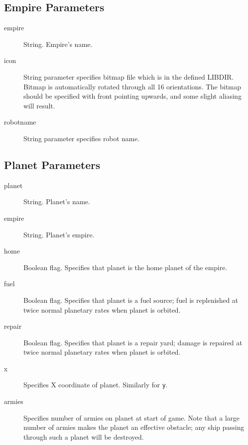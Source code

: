 \begin{itemize}
\subsection{Empire Parameters}
\begin{description}
\item[empire] String. Empire's name.
\item[icon] String parameter specifies bitmap file which is in the defined LIBDIR.  Bitmap is 
automatically rotated through all 16 orientations.  The bitmap should be specified
with front pointing upwards, and some slight aliasing will result.
\item[robotname]  String parameter specifies robot name.
\end{description}

\subsection{Planet Parameters}
\begin{description}
\item[planet] String. Planet's name.
\item[empire] String. Planet's empire.
\item[home]  Boolean flag.  Specifies that planet is the home planet of the
empire.
\item[fuel] Boolean flag.  Specifies that planet is a fuel source; fuel is
replenished at twice normal planetary rates when planet is orbited. 
\item[repair] Boolean flag.  Specifies that planet is a repair yard; damage is
repaired at twice normal planetary rates when planet is orbited. 
\item[x]  Specifies X coordinate of planet.  Similarly for {\tt y}.
\item[armies] Specifies number of armies on planet at start of game.
Note that a large number of  armies makes the planet an effective obstacle;
any ship passing through such a planet will be destroyed.
\end{description}


\end{itemize}
